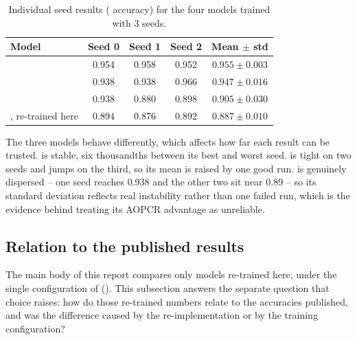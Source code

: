 \begin{table}[htbp]
\caption{Individual seed results (\webtraffic{} accuracy) for the four models trained with 3 seeds.}
\label{tab:seeds}
\begin{center}
\small
\begin{tabular}{lcccc}
\toprule
\textbf{Model} & \textbf{Seed 0} & \textbf{Seed 1} & \textbf{Seed 2} &
\textbf{Mean $\pm$ std} \\
\midrule
\mgat{}                    & 0.954 & 0.958 & 0.952 & $0.955\pm0.003$ \\
\mbot{}                    & 0.938 & 0.938 & 0.966 & $0.947\pm0.016$ \\
\minp{}                    & 0.938 & 0.880 & 0.898 & $0.905\pm0.030$ \\
\millet{}, re-trained here & 0.894 & 0.876 & 0.892 & $0.887\pm0.010$ \\
\bottomrule
\end{tabular}
\end{center}
\end{table}

The three \seanet{} models behave differently, which affects how far each result can be trusted.
\mgat{} is stable, six thousandths between its best and worst seed. \mbot{} is tight on two seeds and
jumps on the third, so its mean is raised by one good run. \minp{} is genuinely dispersed -- one seed
reaches 0.938 and the other two sit near 0.89 -- so its standard deviation reflects real instability
rather than one failed run, which is the evidence behind  treating its AOPCR
advantage as unreliable.

\subsection{Relation to the published \millet{} results}
\label{app:published}

The main body of this report compares only models re-trained here, under the single configuration of
 (). This subsection answers the separate question that
choice raises: how do those re-trained numbers relate to the accuracies \millet{} published, and was
the difference caused by the re-implementation or by the training configuration?

